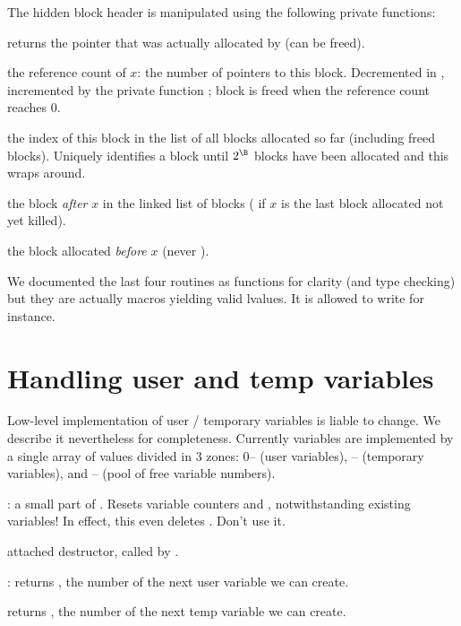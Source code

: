  The hidden block header is manipulated using the
following private functions:

 returns the pointer that was actually allocated
by  (can be freed).

 the reference count of $x$: the number of pointers
to this block. Decremented in , incremented by the private
function ; block is freed when the reference
count reaches $0$.

 the index of this block in the list of all blocks
allocated so far (including freed blocks). Uniquely identifies a block until
$2^\B$ blocks have been allocated and this wraps around.

 the block \emph{after} $x$ in the linked list of
blocks ( if $x$ is the last block allocated not yet killed).

 the block allocated \emph{before} $x$ (never
).

We documented the last four routines as functions for clarity (and type
checking) but they are actually macros yielding valid lvalues. It is allowed
to write  for instance.

\section{Handling user and temp variables}
Low-level implementation of user / temporary variables is liable to change. We
describe it nevertheless for completeness. Currently variables are
implemented by a single array of values divided in 3 zones: 0--
(user variables), -- (temporary variables),
and -- (pool of free variable numbers).


: a small part of . Resets
variable counters  and , notwithstanding existing
variables! In effect, this even deletes . Don't use it.

 attached destructor, called by
.

: returns , the number of the next user
variable we can create.

 returns , the number of the
next temp variable we can create.

